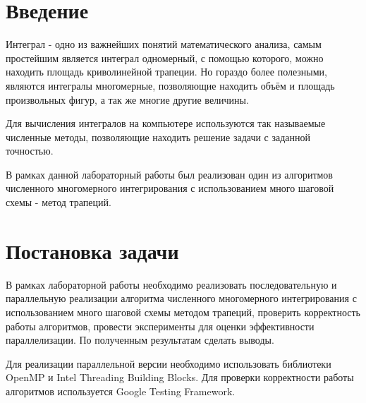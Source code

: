 \documentclass{report}
\begin{document}
\setcounter{page}{2}

\tableofcontents
\newpage

\section*{Введение}
Интеграл - одно из важнейших понятий математического анализа, самым простейшим является интеграл одномерный, с помощью которого, можно находить площадь криволинейной трапеции. Но гораздо более полезными, являются интегралы многомерные, позволяющие находить объём и площадь произвольных фигур, а так же многие другие величины.
\par Для вычисления интегралов на компьютере используются так называемые численные методы, позволяющие находить решение задачи с заданной точностью.
\par В рамках данной лабораторный работы был реализован один из алгоритмов численного многомерного интегрирования с использованием много шаговой схемы - метод трапеций.

\newpage

\section*{Постановка задачи}
В рамках лабораторной работы необходимо реализовать последовательную и параллельную реализации алгоритма численного многомерного интегрирования с использованием много шаговой схемы методом трапеций, проверить корректность работы алгоритмов, провести эксперименты для оценки эффективности параллелизации. По полученным результатам сделать выводы.
\par Для реализации параллельной версии необходимо использовать библиотеки OpenMP и Intel Threading Building Blocks. Для проверки корректности работы алгоритмов используется Google Testing Framework.
\newpage

\end{document}
